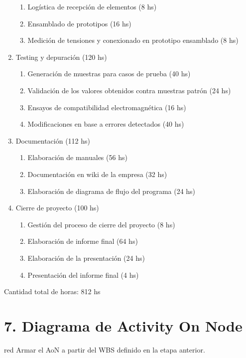 \documentclass[11pt]{charter}
\begin{document}
\begin{enumerate}
\begin{enumerate}
	\item Logística de recepción de elementos (8 hs)
	\item Ensamblado de prototipos (16 hs)
	\item Medición de tensiones y conexionado en prototipo ensamblado (8 hs)
	\end{enumerate}
\item Testing y depuración (120 hs)
	\begin{enumerate}
	\item Generación de muestras para casos de prueba (40 hs)
	\item Validación de los valores obtenidos contra muestras patrón (24 hs)
	\item Ensayos de compatibilidad electromagnética (16 hs)
	\item Modificaciones en base a errores detectados (40 hs)
	\end{enumerate}
\item Documentación (112 hs)
	\begin{enumerate}
	\item Elaboración de manuales (56 hs)
	\item Documentación en wiki de la empresa (32 hs)
	\item Elaboración de diagrama de flujo del programa (24 hs)
	\end{enumerate}
\item Cierre de proyecto (100 hs)
	\begin{enumerate}
	\item Gestión del proceso de cierre del proyecto (8 hs)
	\item Elaboración de informe final (64 hs)
	\item Elaboración de la presentación (24 hs)
	\item Presentación del informe final (4 hs)
	\end{enumerate}
\end{enumerate}

Cantidad total de horas: 812 hs


\section{7. Diagrama de Activity On Node}
\label{sec:AoN}

\begin{consigna}{red}
Armar el AoN a partir del WBS definido en la etapa anterior. 



\end{consigna}
\end{document}

